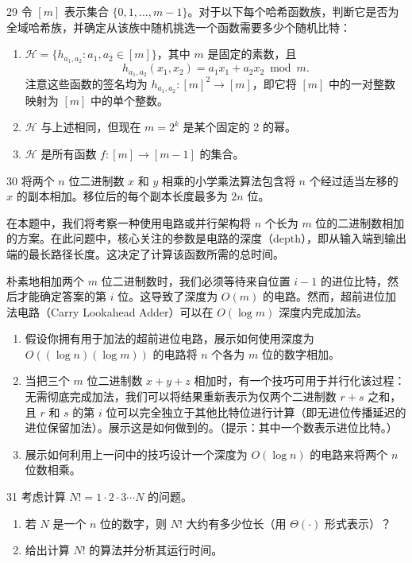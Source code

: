\begin{exercise}{29}
令 $[m]$ 表示集合 $\{0, 1, \dots, m - 1\}$。对于以下每个哈希函数族，判断它是否为全域哈希族，并确定从该族中随机挑选一个函数需要多少个随机比特：
\begin{enumerate}
    \item[(a)] $\mathcal{H} = \{h_{a_1, a_2} : a_1, a_2 \in [m]\}$，其中 $m$ 是固定的素数，且
    \[
    h_{a_1, a_2}(x_1, x_2) = a_1 x_1 + a_2 x_2 \bmod m.
    \]
    注意这些函数的签名均为 $h_{a_1, a_2} : [m]^2 \to [m]$，即它将 $[m]$ 中的一对整数映射为 $[m]$ 中的单个整数。
    \item[(b)] $\mathcal{H}$ 与上述相同，但现在 $m = 2^k$ 是某个固定的 2 的幂。
    \item[(c)] $\mathcal{H}$ 是所有函数 $f : [m] \to [m-1]$ 的集合。
\end{enumerate}
\end{exercise}

\begin{exercise}{30}
将两个 $n$ 位二进制数 $x$ 和 $y$ 相乘的小学乘法算法包含将 $n$ 个经过适当左移的 $x$ 的副本相加。移位后的每个副本长度最多为 $2n$ 位。

在本题中，我们将考察一种使用电路或并行架构将 $n$ 个长为 $m$ 位的二进制数相加的方案。在此问题中，核心关注的参数是电路的深度（depth），即从输入端到输出端的最长路径长度。这决定了计算该函数所需的总时间。

朴素地相加两个 $m$ 位二进制数时，我们必须等待来自位置 $i - 1$ 的进位比特，然后才能确定答案的第 $i$ 位。这导致了深度为 $O(m)$ 的电路。然而，超前进位加法电路（Carry Lookahead Adder）可以在 $O(\log m)$ 深度内完成加法。
\begin{enumerate}
    \item[(a)] 假设你拥有用于加法的超前进位电路，展示如何使用深度为 $O((\log n)(\log m))$ 的电路将 $n$ 个各为 $m$ 位的数字相加。
    \item[(b)] 当把三个 $m$ 位二进制数 $x + y + z$ 相加时，有一个技巧可用于并行化该过程：无需彻底完成加法，我们可以将结果重新表示为仅两个二进制数 $r + s$ 之和，且 $r$ 和 $s$ 的第 $i$ 位可以完全独立于其他比特位进行计算（即无进位传播延迟的进位保留加法）。展示这是如何做到的。（提示：其中一个数表示进位比特。）
    \item[(c)] 展示如何利用上一问中的技巧设计一个深度为 $O(\log n)$ 的电路来将两个 $n$ 位数相乘。
\end{enumerate}
\end{exercise}

\begin{exercise}{31}
考虑计算 $N! = 1 \cdot 2 \cdot 3 \cdots N$ 的问题。
\begin{enumerate}
    \item[(a)] 若 $N$ 是一个 $n$ 位的数字，则 $N!$ 大约有多少位长（用 $\Theta(\cdot)$ 形式表示）？
    \item[(b)] 给出计算 $N!$ 的算法并分析其运行时间。
\end{enumerate}
\end{exercise}

